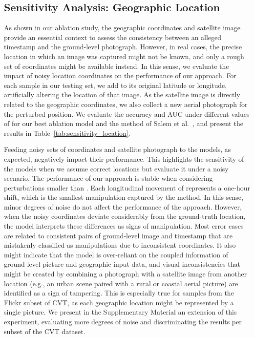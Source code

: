 \documentclass[journal]{IEEEtran}
\begin{document}
        
        
    \subsection{Sensitivity Analysis: Geographic Location}\label{sec:sensitivity_location}
        As shown in our ablation study, the geographic coordinates and satellite image provide an essential context to assess the consistency between an alleged timestamp and the ground-level photograph. However, in real cases, the precise location in which an image was captured might not be known, and only a rough set of coordinates might be available instead. In this sense, we evaluate the impact of noisy location coordinates on the performance of our approach. For each sample in our testing set, we add  to its original latitude or longitude, artificially altering the location of that image. As the satellite image is directly related to the geographic coordinates, we also collect a new aerial photograph for the perturbed position. We evaluate the accuracy and AUC under different values of  for our best ablation model and the method of Salem et al.~\cite{salem2020learning}, and present the results in Table~\ref{tab:sensitivity_location}. 
        
        Feeding noisy sets of coordinates and satellite photograph to the models, as expected, negatively impact their performance. This highlights the sensitivity of the models when we assume correct locations but evaluate it under a noisy scenario. The performance of our approach is stable when considering perturbations smaller than . Each longitudinal movement of  represents a one-hour shift, which is the smallest manipulation captured by the method. In this sense, minor degrees of noise do not affect the performance of the approach. However, when the noisy coordinates deviate considerably from the ground-truth location, the model interprets these differences as signs of manipulation. Most error cases are related to consistent pairs of ground-level image and timestamp that are mistakenly classified as manipulations due to inconsistent coordinates. It also might indicate that the model is over-reliant on the coupled information of ground-level picture and geographic input data, and visual inconsistencies that might be created by combining a photograph with a satellite image from another location (e.g., an urban scene paired with a rural or coastal aerial picture) are identified as a sign of tampering. This is especially true for samples from the Flickr subset of CVT, as each geographic location might be represented by a single picture. We present in the Supplementary Material an extension of this experiment, evaluating more degrees of noise and discriminating the results per subset of the CVT dataset.
        
\end{document}
